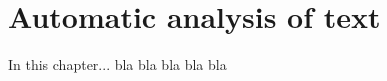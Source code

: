 \chapter{ Automatic analysis of text}
\label{chap:text}

In this chapter... bla bla bla bla bla












